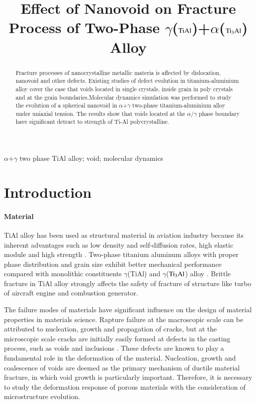 \documentclass[times,12pt]{elsarticle}
\begin{document}
\begin{frontmatter}
\title{Effect of Nanovoid on Fracture Process of Two-Phase $\gamma$($\rm TiAl$)+$\alpha$($\rm Ti_3Al$) Alloy}
\address[mymainaddress]{School of Mechanical and Electronical Engineering, Lanzhou University of Technology. Lanzhou 730050, China}

\begin{abstract}
Fracture processes of nanocrystalline metallic materia is affected by dislocation, nanovoid and other defects. Existing studies of defect evolution in titanium-aluminium alloy cover the case that voids located in single crystals, inside grain in poly crystals and at the grain boundaries.Molecular dynamics simulation was performed to study the evolution of a spherical nanovoid in $\alpha$+$\gamma$ two-phase titanium-aluminium alloy under uniaxial tension. The results show that voids located at the $\alpha$/$\gamma$ phase boundary have significant detract to strength of Ti-Al polycrystalline.
\end{abstract}

\begin{keyword}
$\alpha$+$\gamma$ two phase TiAl alloy; void; molecular dynamics
\end{keyword}

\end{frontmatter}

\section{Introduction}
\paragraph{Material}
TiAl alloy has been used as structural material in aviation industry because its inherent advantages such as low density and self-diffusion rates, high elastic module and high strength \cite{vu2013}. Two-phase titanium aluminum alloys with proper phase distribution and grain size exhibit better mechanical performance compared with monolithic constituents $\gamma$(TiAl) and $\gamma$($\rm Ti_3Al$) alloy \cite{}. Brittle fracture in TiAl alloy strongly affects the safety of fracture of structure like turbo of aircraft engine and combustion generator. 

The failure modes of materials have significant influence on the design of material properties in materials science. Rapture failure at the macroscopic scale can be attributed to nucleation, growth and propagation of cracks, but at the microscopic scale cracks are initially easily formed at defects in the casting process, such as voids and inclusions \cite{}. These defects are known to play a fundamental role in the deformation of the material. Nucleation, growth and coalescence of voids are deemed as the primary mechanism of ductile material fracture, in which void growth is particularly important. Therefore, it is necessary to study the deformation response of porous materials with the consideration of microstructure evolution.
\end{document}
